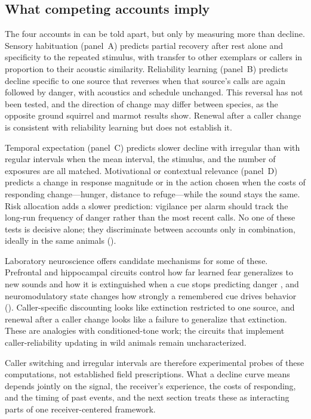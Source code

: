 \subsection{What competing accounts imply}
\label{sec:persistence-synthesis}

The four accounts in  can be told apart, but only by measuring more than decline. Sensory habituation (panel~A) predicts partial recovery after rest alone and specificity to the repeated stimulus, with transfer to other exemplars or callers in proportion to their acoustic similarity. Reliability learning (panel~B) predicts decline specific to one source that reverses when that source's calls are again followed by danger, with acoustics and schedule unchanged. This reversal has not been tested, and the direction of change may differ between species, as the opposite ground squirrel and marmot results show. Renewal after a caller change is consistent with reliability learning but does not establish it.

Temporal expectation (panel~C) predicts slower decline with irregular than with regular intervals when the mean interval, the stimulus, and the number of exposures are all matched. Motivational or contextual relevance (panel~D) predicts a change in response magnitude or in the action chosen when the costs of responding change---hunger, distance to refuge---while the sound stays the same. Risk allocation adds a slower prediction: vigilance per alarm should track the long-run frequency of danger rather than the most recent calls. No one of these tests is decisive alone; they discriminate between accounts only in combination, ideally in the same animals ().

Laboratory neuroscience offers candidate mechanisms for some of these. Prefrontal and hippocampal circuits control how far learned fear generalizes to new sounds and how it is extinguished when a cue stops predicting danger \citep{ConcinaEtAl2018,QuinnEtAl2009,SierraMercadoEtAl2011}, and neuromodulatory state changes how strongly a remembered cue drives behavior (). Caller-specific discounting looks like extinction restricted to one source, and renewal after a caller change looks like a failure to generalize that extinction. These are analogies with conditioned-tone work; the circuits that implement caller-reliability updating in wild animals remain uncharacterized.

Caller switching and irregular intervals are therefore experimental probes of these computations, not established field prescriptions. What a decline curve means depends jointly on the signal, the receiver's experience, the costs of responding, and the timing of past events, and the next section treats these as interacting parts of one receiver-centered framework.
